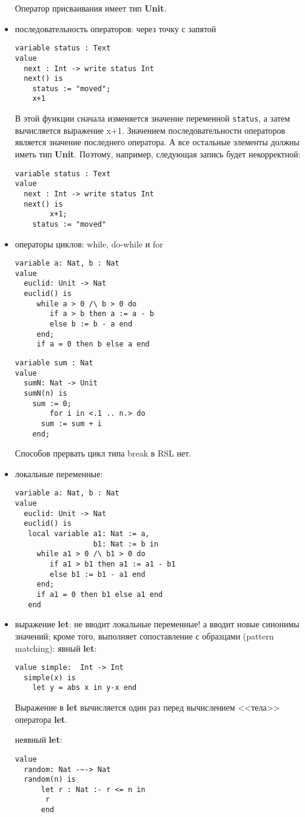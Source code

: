 \begin{itemize}
Оператор присваивания имеет тип \textbf{Unit}.

\item последовательность операторов: через точку с запятой
\begin{lstlisting}
variable status : Text
value
  next : Int -> write status Int
  next() is
	status := "moved";
	x+1	
\end{lstlisting}
В этой функции сначала изменяется значение переменной \texttt{status}, а затем вычисляется выражение x+1. Значением последовательности операторов является значение последнего оператора. А все остальные элементы должны иметь тип \textbf{Unit}. Поэтому, например, следующая запись будет некорректной:
\begin{lstlisting}
variable status : Text
value
  next : Int -> write status Int
  next() is
        x+1;
	status := "moved"
\end{lstlisting}

\item операторы циклов: while, do-while и for
\begin{lstlisting}
variable a: Nat, b : Nat
value
  euclid: Unit -> Nat
  euclid() is
     while a > 0 /\ b > 0 do
        if a > b then a := a - b
        else b := b - a end
     end;
     if a = 0 then b else a end
\end{lstlisting}

\begin{lstlisting}
variable sum : Nat
value
  sumN: Nat -> Unit
  sumN(n) is
	sum := 0;
        for i in <.1 .. n.> do
	  sum := sum + i
	end;
\end{lstlisting}

Способов прервать цикл типа break в RSL нет.

\item локальные переменные:
\begin{lstlisting}
variable a: Nat, b : Nat
value
  euclid: Unit -> Nat
  euclid() is
   local variable a1: Nat := a,
                  b1: Nat := b in
     while a1 > 0 /\ b1 > 0 do
        if a1 > b1 then a1 := a1 - b1
        else b1 := b1 - a1 end
     end;
     if a1 = 0 then b1 else a1 end
   end
\end{lstlisting}

\item выражение \textbf{let}: не вводит локальные переменные! а вводит новые синонимы значений; кроме того, выполняет сопоставление с образцами (pattern matching):
явный \textbf{let}:
\begin{lstlisting}
value simple:  Int -> Int
  simple(x) is
    let y = abs x in y-x end
\end{lstlisting}

Выражение в \textbf{let} вычисляется один раз перед вычислением <<тела>> оператора \textbf{let}.

неявный \textbf{let}:
\begin{lstlisting}
value
  random: Nat -~-> Nat
  random(n) is
      let r : Nat :- r <= n in
	   r
      end	
\end{lstlisting}

\end{itemize}


